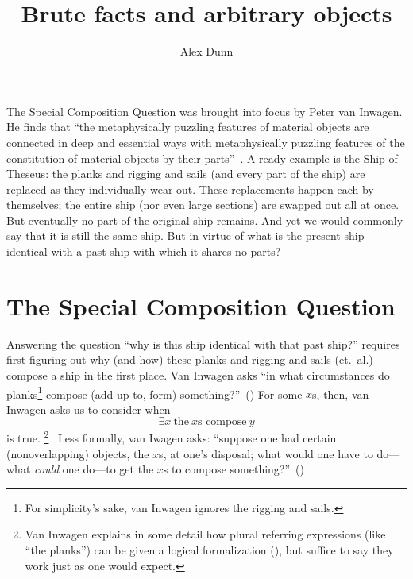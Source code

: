 \documentclass[11pt]{article}
\title{Brute facts and arbitrary objects}
\author{Alex Dunn}
\begin{document}
\ifstandalone
\maketitle
\begin{spacing}{1.5}
\fi

\noindent The Special Composition Question was brought into focus by Peter van Inwagen. He finds that ``the metaphysically puzzling features of material objects are connected in deep and essential ways with metaphysically puzzling features of the constitution of material objects by their parts''~\citep[18]{inwagen1995}. A ready example is the Ship of Theseus: the planks and rigging and sails (and every part of the ship) are replaced as they individually wear out. These replacements happen each by themselves; the entire ship (nor even large sections) are swapped out all at once. But eventually no part of the original ship remains. And yet we would commonly say that it is still the same ship. But in virtue of what is the present ship identical with a past ship with which it shares no parts?

\section{The Special Composition Question}
Answering the question ``why is this ship identical with that past ship?'' requires first figuring out why (and how) these planks and rigging and sails (et.\ al.) compose a ship in the first place. Van Inwagen asks ``in what circumstances do planks\footnote{For simplicity's sake, van Inwagen ignores the rigging and sails.} compose (add up to, form) something?''~(\citeyear[21]{inwagen1995}) For some $x$s, then, van Inwagen asks us to consider when
\begin{equation}
\exists x\ \text{the}\ x\text{s compose}\ y
\end{equation}
is true.%
\footnote{Van Inwagen explains in some detail how plural referring expressions (like ``the planks'') can be given a logical formalization (\citeyear[23--28]{inwagen1995}), but suffice to say they work just as one would expect.}%
%
\ Less formally, van Iwagen asks: ``suppose one had certain (nonoverlapping) objects, the $x$s, at one's disposal; what would one have to do---what {\em could} one do---to get the $x$s to compose something?''~(\citeyear[31]{inwagen1995})


\end{spacing}
\end{document}
